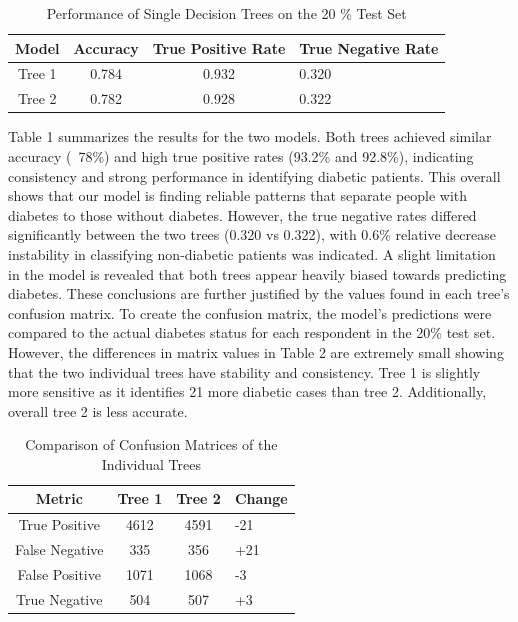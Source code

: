 \documentclass{article}
\theoremstyle{plain}
\theoremstyle{definition}
\theoremstyle{remark}
\begin{document}
\begin{table}
    \centering
    \begin{tabular}{cccl}\toprule
         Model& Accuracy& True Positive Rate & True Negative Rate\\\midrule
         Tree 1&  0.784&  0.932&0.320\\
         Tree 2&  0.782&  0.928&0.322\\ \bottomrule
    \end{tabular}
    \caption{Performance of Single Decision Trees on the 20 \% Test Set}
    \label{tab:placeholder}
\end{table}
Table 1 summarizes the results for the two models. Both trees achieved similar accuracy (~78\%) and high true positive rates (93.2\% and 92.8\%), indicating consistency and strong performance in identifying diabetic patients. This overall shows that our model is finding reliable patterns that separate people with diabetes to those without diabetes. However, the true negative rates differed significantly between the two trees (0.320 vs 0.322), with 0.6\% relative decrease instability in classifying non-diabetic patients was indicated. A slight limitation in the model is revealed that both trees appear heavily biased towards predicting diabetes. 
These conclusions are further justified by the values found in each tree's confusion matrix. To create the confusion matrix, the model’s predictions were compared to the actual diabetes status for each respondent in the 20\% test set. However, the differences in matrix values in Table 2 are extremely small showing that the two individual trees have stability and consistency.  Tree 1 is slightly more sensitive as it identifies 21 more diabetic cases than tree 2. Additionally, overall tree 2 is less accurate. 

\begin{table}
    \centering
    \begin{tabular}{cccl}\toprule
         Metric& Tree 1& Tree 2& Change\\\midrule
         True Positive&  4612&  4591& -21\\
         False Negative&  335&  356& +21\\
         False Positive&  1071&  1068& -3\\
         True Negative&  504&  507 & +3\\ \bottomrule
    \end{tabular}
    \caption{Comparison of Confusion Matrices of the Individual Trees}
    \label{tab:placeholder}
\end{table}
\end{document}
